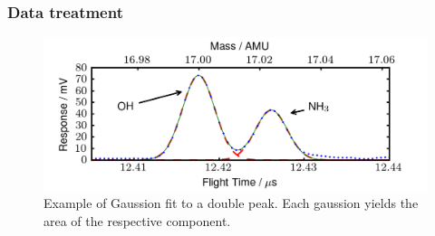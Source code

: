 \documentclass[aip,rsi]{revtex4-1}
\begin{document}
\subsubsection{Data treatment}
\begin{figure}
 \includegraphics[width=14cm]{ammonia_OH_gauss_fit.png}%
 \caption{Example of Gaussion fit to a double peak. Each gaussion yields the area of the respective component.\label{fig:gaussian_fit}}%
\end{figure}
\end{document}
